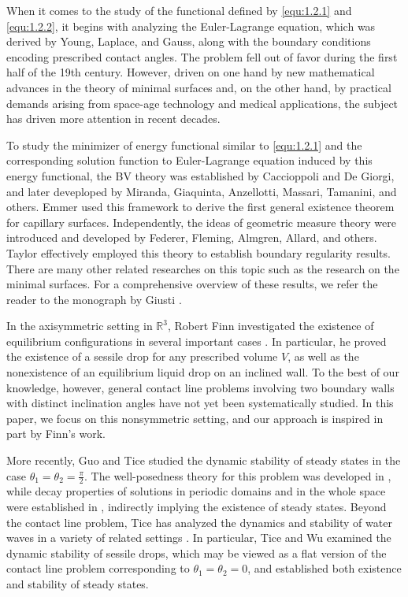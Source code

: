 \documentclass[letterpaper,reqno,10pt,twoside]{amsart}
\theoremstyle{definition}
\theoremstyle{remark}
\begin{document}
   When it comes to the study of the functional defined by \eqref{equ:1.2.1} and \eqref{equ:1.2.2}, it begins with analyzing the Euler-Lagrange equation, which was derived by Young\cite{Young}, Laplace\cite{Laplace}, and Gauss\cite{Gauss}, along with the boundary conditions encoding prescribed contact angles. The problem fell out of favor during the first half of the 19th century. However, driven on one hand by new mathematical advances in the theory of minimal surfaces and, on the other hand, by practical demands arising from space-age technology and medical applications, the subject has driven more attention in recent decades.

  To study the minimizer of energy functional similar to  \eqref{equ:1.2.1} and the corresponding solution function to Euler-Lagrange equation induced by this energy functional, the BV theory was established by Caccioppoli and De Giorgi, and later deveploped by Miranda, Giaquinta, Anzellotti, Massari, Tamanini, and others. Emmer \cite{Emmer} used this framework to derive the first general existence theorem for capillary surfaces. Independently, the 
ideas of geometric measure theory were introduced and developed by 
Federer, Fleming, Almgren, Allard, and others. Taylor \cite{Taylor} effectively employed this theory to establish boundary regularity results. There are many other related researches on this topic such as the research on the minimal surfaces. For a comprehensive overview of these results, we refer the reader to the monograph by Giusti \cite{Giusti}.

    In the axisymmetric setting in $\mathbb{R}^3$, Robert Finn investigated the existence of equilibrium configurations in several important cases \cite{Finn}. In particular, he proved the existence of a sessile drop for any prescribed volume $V$, as well as the nonexistence of an equilibrium liquid drop on an inclined wall. To the best of our knowledge, however, general contact line problems involving two boundary walls with distinct inclination angles have not yet been systematically studied. In this paper, we focus on this nonsymmetric setting, and our approach is inspired in part by Finn’s work.
    
    More recently, Guo and Tice \cite{Guo,Guo2} studied the dynamic stability of steady states in the case $\theta_{1}=\theta_{2}=\frac{\pi}{2}$. The well-posedness theory for this problem was developed in \cite{Guo1,Guo3,Zheng}, while decay properties of solutions in periodic domains and in the whole space were established in \cite{Guo4,Guo5}, indirectly implying the existence of steady states. Beyond the contact line problem, Tice has analyzed the dynamics and stability of water waves in a variety of related settings \cite{Kim,Tice1,Tice2,Tice3,Tice4,Tice5}. In particular, Tice and Wu \cite{Tice} examined the dynamic stability of sessile drops, which may be viewed as a flat version of the contact line problem corresponding to $\theta_{1}=\theta_{2}=0$, and established both existence and stability of steady states.
\end{document}
